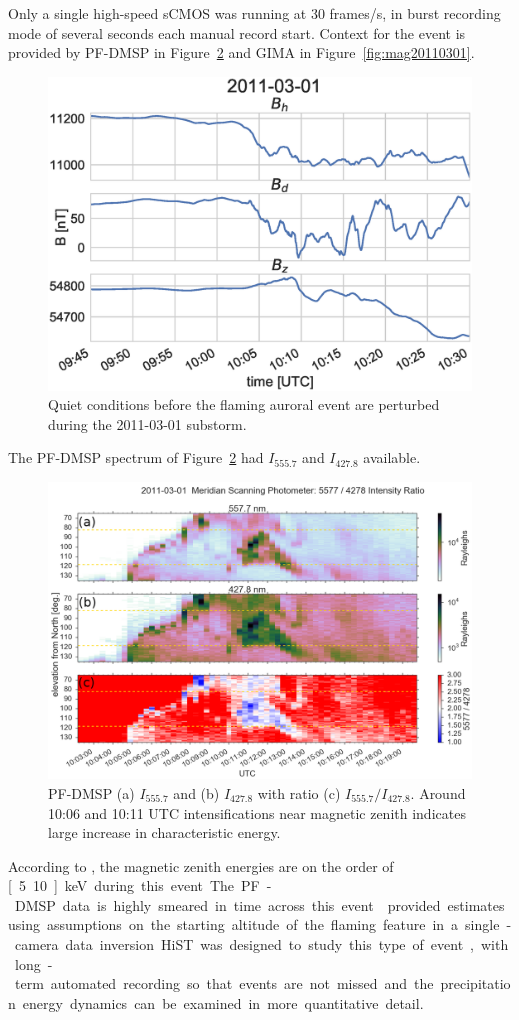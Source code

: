 Only a single high-speed sCMOS was running at 30 frames/s, in burst recording mode of several seconds each manual record start.
Context for the event is provided by PF-DMSP in Figure~\ref{fig:msp20110301} and GIMA in Figure~\ref{fig:mag20110301}.
\begin{figure}\centering
    \includegraphics[width=\columnwidth]{gfx/2011-03-01/mag}
    \caption{Quiet conditions before the flaming auroral event are perturbed during the 2011-03-01 substorm.}
    \label{mag:20110301}
\end{figure}
The PF-DMSP spectrum of Figure~\ref{fig:msp20110301} had $I_{555.7}$ and $I_{427.8}$ available.
\begin{figure}\centering
    \includegraphics[width=\columnwidth]{gfx/2011-03-01/msp_ratio}
    \caption{PF-DMSP (a) $I_{555.7}$ and (b) $I_{427.8}$ with ratio (c) $I_{555.7} / I_{427.8}$. Around 10:06 and 10:11 UTC  intensifications near magnetic zenith indicates large increase in characteristic energy.}
    \label{fig:msp20110301}
\end{figure}
According to \citet{rees1974}, the magnetic zenith energies are on the order of \unit[5..10]{keV} during this event.
The PF-DMSP data is highly smeared in time across this event.
\citet{dahlgren2013} provided estimates using assumptions on the starting altitude of the flaming feature in a single-camera data inversion.
HiST was designed to study this type of event, with long-term automated recording so that events are not missed and the precipitation energy dynamics can be examined in more quantitative detail.